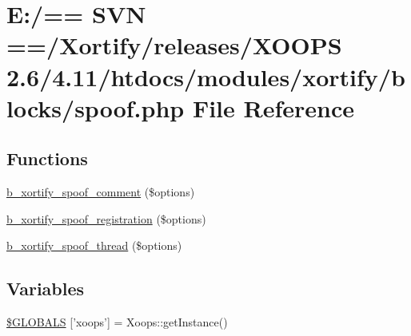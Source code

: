 \hypertarget{spoof_8php}{\section{E\-:/== S\-V\-N ==/\-Xortify/releases/\-X\-O\-O\-P\-S 2.6/4.11/htdocs/modules/xortify/blocks/spoof.php File Reference}
\label{spoof_8php}
}
\subsection*{Functions}
\begin{DoxyCompactItemize}
\item 
\hyperlink{spoof_8php_ad7f6bff091c57019f377538b4c230400}{b\-\_\-xortify\-\_\-spoof\-\_\-comment} (\$options)
\item 
\hyperlink{spoof_8php_a25f011e1427a84190227f2af20439066}{b\-\_\-xortify\-\_\-spoof\-\_\-registration} (\$options)
\item 
\hyperlink{spoof_8php_a2ee38967658737c4e483c0a01f2c3b29}{b\-\_\-xortify\-\_\-spoof\-\_\-thread} (\$options)
\end{DoxyCompactItemize}
\subsection*{Variables}
\begin{DoxyCompactItemize}
\item 
\hyperlink{spoof_8php_ad10934112c0d18cf6b358d47afa6fcf1}{\$\-G\-L\-O\-B\-A\-L\-S} \mbox{[}'xoops'\mbox{]} = Xoops\-::get\-Instance()
\end{DoxyCompactItemize}


